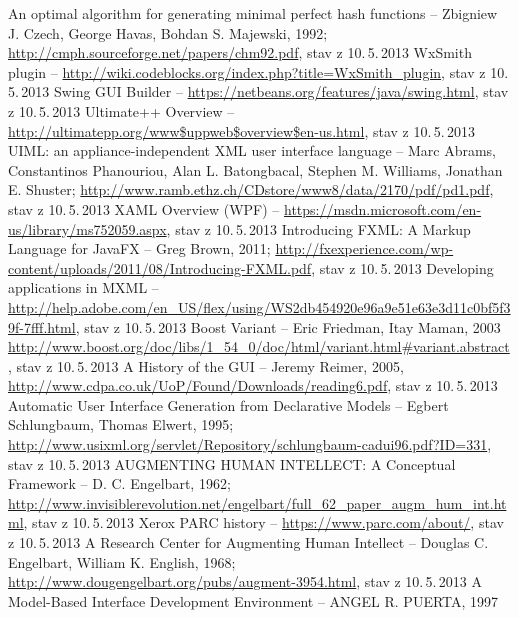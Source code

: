 \documentclass[11pt,twoside,a4paper]{book}
\begin{document}

\begin{thebibliography}{99}
 An optimal algorithm for generating minimal perfect hash functions -- Zbigniew J. Czech, George Havas, Bohdan S. Majewski, 1992; \url{http://cmph.sourceforge.net/papers/chm92.pdf}, stav z 10.\,5.\,2013
 WxSmith plugin -- \url{http://wiki.codeblocks.org/index.php?title=WxSmith_plugin}, stav z 10.\,5.\,2013
 Swing GUI Builder -- \url{https://netbeans.org/features/java/swing.html}, stav z 10.\,5.\,2013
 Ultimate++ Overview -- \url{http://ultimatepp.org/www$uppweb$overview$en-us.html}, stav z 10.\,5.\,2013
 UIML: an appliance-independent XML user interface language -- Marc Abrams, Constantinos Phanouriou, Alan L. Batongbacal, Stephen M. Williams, Jonathan E. Shuster; \url{http://www.ramb.ethz.ch/CDstore/www8/data/2170/pdf/pd1.pdf}, stav z 10.\,5.\,2013
 XAML Overview (WPF) -- \url{https://msdn.microsoft.com/en-us/library/ms752059.aspx}, stav z 10.\,5.\,2013
 Introducing FXML: A Markup Language for JavaFX -- Greg Brown, 2011; \url{http://fxexperience.com/wp-content/uploads/2011/08/Introducing-FXML.pdf}, stav z 10.\,5.\,2013
 Developing applications in MXML -- \url{http://help.adobe.com/en_US/flex/using/WS2db454920e96a9e51e63e3d11c0bf5f39f-7fff.html}, stav z 10.\,5.\,2013
 Boost Variant -- Eric Friedman, Itay Maman, 2003 \url{http://www.boost.org/doc/libs/1_54_0/doc/html/variant.html#variant.abstract}, stav z 10.\,5.\,2013
 A History of the GUI -- Jeremy Reimer, 2005, \url{http://www.cdpa.co.uk/UoP/Found/Downloads/reading6.pdf}, stav z 10.\,5.\,2013
 Automatic User Interface Generation from Declarative Models -- Egbert Schlungbaum, Thomas Elwert, 1995; \url{http://www.usixml.org/servlet/Repository/schlungbaum-cadui96.pdf?ID=331}, stav z 10.\,5.\,2013
 AUGMENTING HUMAN INTELLECT: A Conceptual Framework -- D. C. Engelbart, 1962; \url{http://www.invisiblerevolution.net/engelbart/full_62_paper_augm_hum_int.html}, stav z 10.\,5.\,2013
 Xerox PARC history -- \url{https://www.parc.com/about/}, stav z 10.\,5.\,2013
 A Research Center for Augmenting Human Intellect -- Douglas C. Engelbart, William K. English, 1968; \url{http://www.dougengelbart.org/pubs/augment-3954.html}, stav z 10.\,5.\,2013
 A Model-Based Interface Development Environment -- ANGEL R. PUERTA, 1997
\end{thebibliography}
\end{document}

